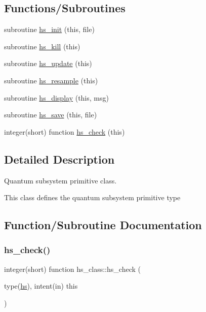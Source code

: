 \subsection*{Functions/\+Subroutines}
\begin{DoxyCompactItemize}
\item 
subroutine \hyperlink{namespacehs__class_a7857d1f3d6a49cfbc7d397a084a9013f}{hs\+\_\+init} (this, file)
\item 
subroutine \hyperlink{namespacehs__class_a1d1b34bdecfb1004bd277bf53dbd3e92}{hs\+\_\+kill} (this)
\item 
subroutine \hyperlink{namespacehs__class_a8a479624da65dc4f4a5cae9826487bec}{hs\+\_\+update} (this)
\item 
subroutine \hyperlink{namespacehs__class_abf39e51fc1d47061279287a7e328d9d4}{hs\+\_\+resample} (this)
\item 
subroutine \hyperlink{namespacehs__class_af457ecc48ec3ffc1c107162e546155ce}{hs\+\_\+display} (this, msg)
\item 
subroutine \hyperlink{namespacehs__class_a3b78604825b27d4d06a70aac14b8c538}{hs\+\_\+save} (this, file)
\item 
integer(short) function \hyperlink{namespacehs__class_add814b6ed9b2a64f43ea34b91ce20894}{hs\+\_\+check} (this)
\end{DoxyCompactItemize}


\subsection{Detailed Description}
Quantum subsystem primitive class. 

This class defines the quantum subsystem primitive type 

\subsection{Function/\+Subroutine Documentation}
\mbox{\label{namespacehs__class_add814b6ed9b2a64f43ea34b91ce20894}} 
\subsubsection{\texorpdfstring{hs\+\_\+check()}{hs\_check()}}
{\footnotesize\ttfamily integer(short) function hs\+\_\+class\+::hs\+\_\+check (\begin{DoxyParamCaption}\item[{type(\hyperlink{strucths__class_1_1hs}{hs}), intent(in)}]{this }\end{DoxyParamCaption})\hspace{0.3cm}{\ttfamily [private]}}

